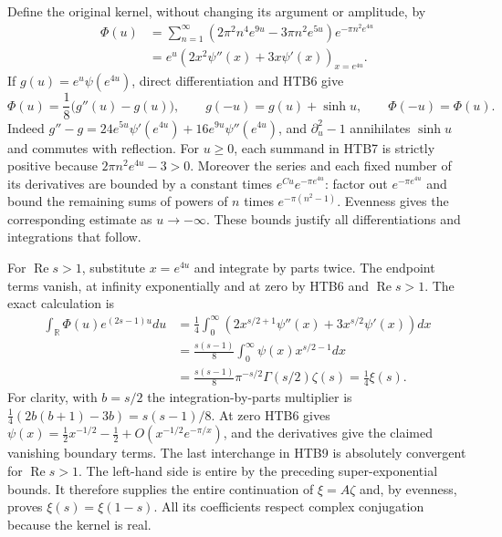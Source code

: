 Define the original kernel, without changing its argument or amplitude,
by
\begin{equation}\tag{HTB7}
\begin{split}
 \Phi(u)
 &=\sum_{n=1}^{\infty}
   \left(2\pi^2n^4e^{9u}-3\pi n^2e^{5u}\right)
       e^{-\pi n^2e^{4u}}\\
 &=e^u\left(2x^2\psi''(x)+3x\psi'(x)\right)_{x=e^{4u}}.
\end{split}
\end{equation}
If $g(u)=e^u\psi(e^{4u})$, direct differentiation and HTB6 give
\begin{equation}\tag{HTB8}
 \Phi(u)=\frac18\bigl(g''(u)-g(u)\bigr),\qquad
 g(-u)=g(u)+\sinh u,\qquad \Phi(-u)=\Phi(u).
\end{equation}
Indeed $g''-g=24e^{5u}\psi'(e^{4u})+16e^{9u}\psi''(e^{4u})$,
and $\partial_u^2-1$ annihilates $\sinh u$ and commutes with reflection.
For $u\ge0$, each summand in HTB7 is strictly positive because
$2\pi n^2 e^{4u}-3>0$. Moreover the series and each fixed number of its
derivatives are bounded by a constant times $e^{C u}e^{-\pi e^{4u}}$:
factor out $e^{-\pi e^{4u}}$ and bound the remaining sums of powers of
$n$ times $e^{-\pi(n^2-1)}$. Evenness gives the corresponding estimate
as $u\to-\infty$. These bounds justify all differentiations and
integrations that follow.

For $\operatorname{Re}s>1$, substitute $x=e^{4u}$ and integrate by parts
twice. The endpoint terms vanish, at infinity exponentially and at zero
by HTB6 and $\operatorname{Re}s>1$. The exact calculation is
\begin{equation}\tag{HTB9}
\begin{split}
 \int_{\mathbb R}\Phi(u)e^{(2s-1)u}du
 &=\frac14\int_0^{\infty}
       \left(2x^{s/2+1}\psi''(x)+3x^{s/2}\psi'(x)\right)dx\\
 &=\frac{s(s-1)}8\int_0^{\infty}\psi(x)x^{s/2-1}dx\\
 &=\frac{s(s-1)}8\pi^{-s/2}\Gamma(s/2)\zeta(s)
 =\frac14\xi(s).
\end{split}
\end{equation}
For clarity, with $b=s/2$ the integration-by-parts multiplier is
$\frac14(2b(b+1)-3b)=s(s-1)/8$. At zero HTB6 gives
$\psi(x)=\frac12x^{-1/2}-\frac12+O(x^{-1/2}e^{-\pi/x})$, and the
derivatives give the claimed vanishing boundary terms. The last
interchange in HTB9 is absolutely convergent for $\operatorname{Re}s>1$.
The left-hand side is entire by the preceding super-exponential bounds.
It therefore supplies the entire continuation of $\xi=A\zeta$ and,
by evenness, proves $\xi(s)=\xi(1-s)$. All its coefficients respect
complex conjugation because the kernel is real.

